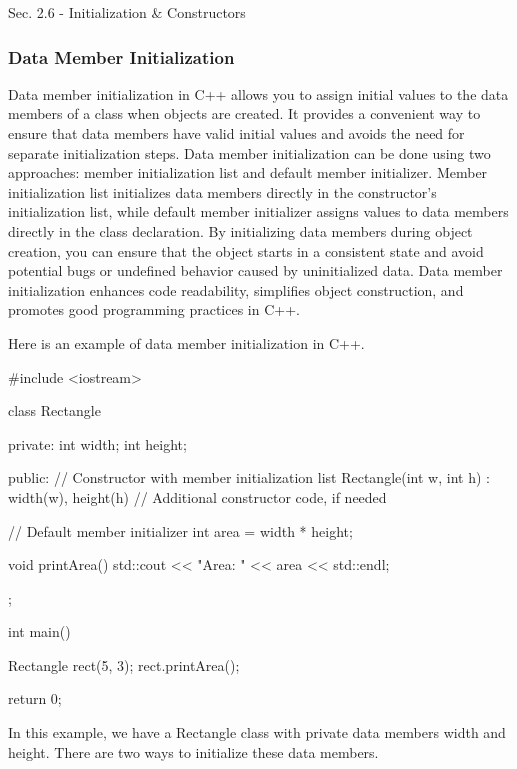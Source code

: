 \begin{notes}{Sec. 2.6 - Initialization \& Constructors}
    \subsubsection*{Data Member Initialization}

    Data member initialization in C++ allows you to assign initial values to the data members of a class when objects are created. It provides a convenient way to ensure that data members have valid initial values and avoids 
    the need for separate initialization steps. Data member initialization can be done using two approaches: member initialization list and default member initializer. Member initialization list initializes data members directly 
    in the constructor's initialization list, while default member initializer assigns values to data members directly in the class declaration. By initializing data members during object creation, you can ensure that the object 
    starts in a consistent state and avoid potential bugs or undefined behavior caused by uninitialized data. Data member initialization enhances code readability, simplifies object construction, and promotes good programming 
    practices in C++.
    
    \begin{highlight}
        Here is an example of data member initialization in C++.
    \begin{code}[C++]
    #include <iostream>

    class Rectangle {
    private:
        int width;
        int height;
    
    public:
        // Constructor with member initialization list
        Rectangle(int w, int h) : width(w), height(h) {
            // Additional constructor code, if needed
        }
    
        // Default member initializer
        int area = width * height;
    
        void printArea() {
            std::cout << "Area: " << area << std::endl;
        }
    };
    
    int main() {
        Rectangle rect(5, 3);
        rect.printArea();
    
        return 0;
    }        
    \end{code}
        In this example, we have a Rectangle class with private data members width and height. There are two ways to initialize these data members.
    

\end{highlight}
\end{notes}

